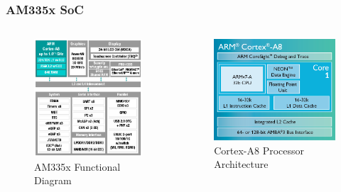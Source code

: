 \documentclass[aspectratio=169]{beamer}
\begin{document}
\begin{frame}
  \frametitle{AM335x SoC}
  \begin{columns}
      \begin{figure}
        \centering
        \includegraphics[scale=0.4]{images/am335x.png}
        \caption{AM335x Functional Diagram}
      \end{figure}
      \vspace*{-12mm} %
      \begin{figure}
        \centering
        \includegraphics[scale=1]{images/cortex-a8.png}
        \caption{Cortex-A8 Processor Architecture}
      \end{figure}
  \end{columns}
\end{frame}
\end{document}
